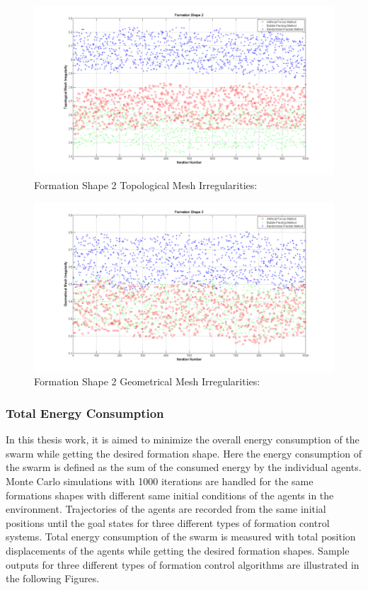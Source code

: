 \documentclass[twoside]{article}
\begin{document}
				\begin{figure}[H]
					\caption{Formation Shape 2 Topological Mesh Irregularities:}
					\centerline{\includegraphics[scale = 0.45]{Topological_Irr_2}}
				\end{figure} 	
				
								\begin{figure}[H]
									\caption{Formation Shape 2 Geometrical Mesh Irregularities:}
									\centerline{\includegraphics[scale = 0.45]{Geometrical_Irr_2}}
								\end{figure} 	
		
		
		
		
		  \subsubsection{Total Energy Consumption} 
		
		In this thesis work, it is aimed to minimize the overall energy consumption of the swarm while getting the desired formation shape. Here the energy consumption of the swarm is defined as the sum of the consumed energy by the individual agents. Monte Carlo simulations with 1000 iterations are handled for the same formations shapes with different same initial conditions of the agents in the environment. 				Trajectories of the agents are recorded from the same initial positions until the goal states for three different types of formation control systems. Total energy consumption of the swarm is measured with total position displacements of the agents while getting the desired formation shapes. Sample outputs for three different types of formation control algorithms are illustrated in the following Figures.
		
\end{document}
